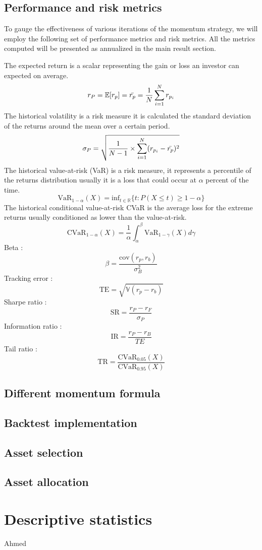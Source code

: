 \documentclass{article}
\begin{document}
\subsection{Performance and risk metrics}
To gauge the effectiveness of various iterations of the momentum strategy, we will employ the following set of performance metrics and risk metrics. All the metrics computed will be presented as annualized in the main result section.

The expected return is a scalar representing the gain or loss an investor can expected on average. $$r_P=\mathbb{E}[r_p]=\Bar{r_p}=\frac{1}{N}\sum_{i=1}^Nr_{p_i}$$
The historical volatility is a risk measure it is calculated the standard deviation of the returns around the mean over a certain period. $$\sigma_P = \sqrt{\frac{1}{N-1}\times\sum^N_{i=1}(r_{p_i}-\Bar{r_p})^2}$$
The historical value-at-risk (VaR) is a risk measure, it represents a percentile of the returns distribution usually it is a loss that could occur at $\alpha$ percent of the time. $$\text{VaR}_{1-\alpha}(X)=\text{inf}_{t\in\mathbb{R}}\{t:P(X\leq t)\geq1-\alpha\}$$
The historical conditional value-at-risk CVaR is the average loss for the extreme returns usually conditioned as lower than the value-at-risk. $$\text{CVaR}_{1-\alpha}(X)=\frac{1}{\alpha}\int_\alpha^\beta\text{VaR}_{1-\gamma}(X)d\gamma$$
Beta : $$\beta = \frac{\text{cov}(r_p,r_b)}{\sigma_B^2}$$
Tracking error : $$\text{TE}=\sqrt{\mathbb{V}(r_p-r_b)}$$
Sharpe ratio : $$\text{SR} = \frac{r_P-r_F}{\sigma_P}$$
Information ratio :$$\text{IR} = \frac{r_P-r_B}{TE}$$
Tail ratio : $$\text{TR}=\frac{\text{CVaR}_{0.05}(X)}{\text{CVaR}_{0.95}(X)}$$\newline


\subsection{Different momentum formula}
\subsection{Backtest implementation}
\subsection{Asset selection}
\subsection{Asset allocation}
\section{Descriptive statistics}
Ahmed
\end{document}
